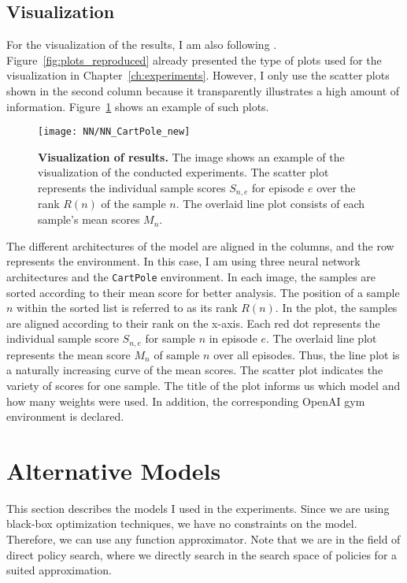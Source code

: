 \subsection{Visualization}
For the visualization of the results, I am also following \cite{oller_analyzing_2020}. Figure~\ref{fig:plots_reproduced} already presented the type of plots used for the visualization in Chapter~\ref{ch:experiments}. However, I only use the scatter plots shown in the second column because it transparently illustrates a high amount of information. Figure~\ref{fig:visualization} shows an example of such plots.
\begin{figure}[!ht]
  \centering
\texttt{[image: NN/NN\_CartPole\_new]}
\caption[Visualization of results]{
  \textbf{Visualization of results.}
  The image shows an example of the visualization of the conducted experiments. The scatter plot represents the individual sample scores $S_{n,e}$ for episode $e$ over the rank $R(n)$ of the sample $n$. The overlaid line plot consists of each sample's mean scores $M_n$.
}
\label{fig:visualization}
\end{figure}
The different architectures of the model are aligned in the columns, and the row represents the environment. In this case, I am using three neural network architectures and the \verb|CartPole| environment. In each image, the samples are sorted according to their mean score for better analysis. The position of a sample $n$ within the sorted list is referred to as its rank $R(n)$. In the plot, the samples are aligned according to their rank on the x-axis. Each red dot represents the individual sample score $S_{n,e}$ for sample $n$ in episode $e$. The overlaid line plot represents the mean score $M_n$ of sample $n$ over all episodes. Thus, the line plot is a naturally increasing curve of the mean scores. The scatter plot indicates the variety of scores for one sample. The title of the plot informs us which model and how many weights were used. In addition, the corresponding OpenAI gym environment is declared.


\section{Alternative Models}
\label{sec:models}
This section describes the models I used in the experiments. Since we are using black-box optimization techniques, we have no constraints on the model. Therefore, we can use any function approximator. Note that we are in the field of direct policy search, where we directly search in the search space of policies for a suited approximation.

